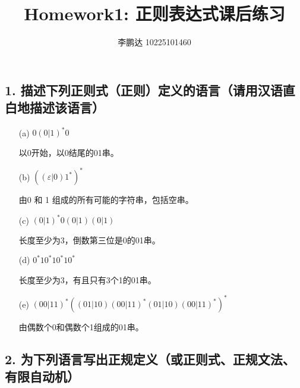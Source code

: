 \documentclass[a4paper, body={18cm,22cm}]{article}
\title{Homework1: 正则表达式课后练习}
\author{李鹏达 10225101460}
\date{}
\begin{document}
\maketitle

\subsection*{1. 描述下列正则式（正则）定义的语言（请用汉语直白地描述该语言）}

\begin{enumerate}
    \item[(a)] \(0(0|1)^*0\)

    以0开始，以0结尾的01串。
    \item[(b)] \(((\varepsilon | 0)1^*)^*\)
    
    由0 和 1 组成的所有可能的字符串，包括空串。
    \item[(c)] \((0|1)^*0(0|1)(0|1)\)
    
    长度至少为3，倒数第三位是0的01串。
    \item[(d)] \(0^*10^*10^*10^*\)
    
    长度至少为3，有且只有3个1的01串。
    \item[(e)] \((00|11)^*((01|10)(00|11)^*(01|10)(00|11)^*)^*\)
    
    由偶数个0和偶数个1组成的01串。
\end{enumerate}

\subsection*{2. 为下列语言写出正规定义（或正则式、正规文法、有限自动机）}
\end{document}
